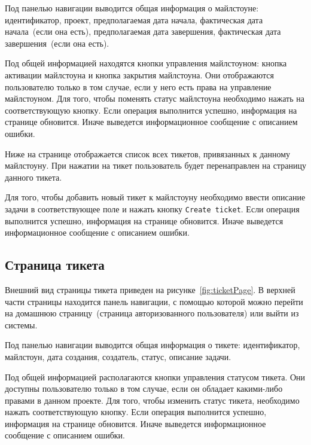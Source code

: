Под панелью навигации выводится общая информация о майлстоуне: идентификатор, проект, предполагаемая дата начала, фактическая дата начала~(если она есть), предполагаемая дата завершения, фактическая дата завершения~(если она есть).

Под общей информацией находятся кнопки управления майлстоуном: кнопка активации майлстоуна и кнопка закрытия майлстоуна. Они отображаются пользователю только в том случае, если у него есть права на управление майлстоуном. Для того, чтобы поменять статус майлстоуна необходимо нажать на соответствующую кнопку. Если операция выполнится успешно, информация на странице обновится. Иначе выведется информационное сообщение с описанием ошибки.

Ниже на странице отображается список всех тикетов, привязанных к данному майлстоуну. При нажатии на тикет пользователь будет перенаправлен на страницу данного тикета.

Для того, чтобы добавить новый тикет к майлстоуну необходимо ввести описание задачи в соответствующее поле и нажать кнопку \texttt{Create ticket}. Если операция выполнится успешно, информация на странице обновится. Иначе выведется информационное сообщение с описанием ошибки.

\subsection{Страница тикета}
Внешний вид страницы тикета приведен на рисунке~\ref{fig:ticketPage}. В верхней части страницы находится панель навигации, с помощью которой можно перейти на домашнюю страницу~(страница авторизованного пользователя) или выйти из системы. 

Под панелью навигации выводится общая информация о тикете: идентификатор, майлстоун, дата создания, создатель, статус, описание задачи.

Под общей информацией располагаются кнопки управления статусом тикета. Они доступны пользователю только в том случае, если он обладает какими-либо правами в данном проекте. Для того, чтобы изменить статус тикета, необходимо нажать соответствующую кнопку. Если операция выполнится успешно, информация на странице обновится. Иначе выведется информационное сообщение с описанием ошибки.

